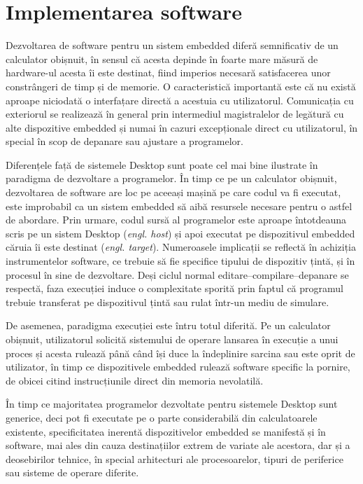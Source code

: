 \chapter{Implementarea software}

Dezvoltarea de software pentru un sistem embedded diferă semnificativ de un calculator obișnuit, în sensul că acesta depinde în foarte mare măsură de hardware-ul acesta îi este destinat, fiind imperios necesară satisfacerea unor constrângeri de timp și de memorie. O caracteristică importantă este că nu există aproape niciodată o interfațare directă a acestuia cu utilizatorul. Comunicația cu exteriorul se realizează în general prin intermediul magistralelor de legătură cu alte dispozitive embedded și numai în cazuri excepționale direct cu utilizatorul, în special în scop de depanare sau ajustare a programelor.

Diferențele față de sistemele Desktop sunt poate cel mai bine ilustrate în paradigma de dezvoltare a programelor. În timp ce pe un calculator obișnuit, dezvoltarea de software are loc pe aceeași mașină pe care codul va fi executat, este improbabil ca un sistem embedded să aibă resursele necesare pentru o astfel de abordare. Prin urmare, codul sursă al programelor este aproape întotdeauna scris pe un sistem Desktop (\textit{engl. host}) și apoi executat pe dispozitivul embedded căruia îi este destinat (\textit{engl. target}). Numeroasele implicații se reflectă în achiziția instrumentelor software, ce trebuie să fie specifice tipului de dispozitiv țintă, și în procesul în sine de dezvoltare. Deși ciclul normal editare--compilare--depanare se respectă, faza execuției induce o complexitate sporită prin faptul că programul trebuie transferat pe dispozitivul țintă sau rulat într-un mediu de simulare. \cite{walls}

De asemenea, paradigma execuției este întru totul diferită. Pe un calculator obișnuit, utilizatorul solicită sistemului de operare lansarea în execuție a unui proces și acesta rulează până când își duce la îndeplinire sarcina sau este oprit de utilizator, în timp ce dispozitivele embedded rulează software specific la pornire, de obicei citind instrucțiunile direct din memoria nevolatilă. \cite{walls}

În timp ce majoritatea programelor dezvoltate pentru sistemele Desktop sunt generice, deci pot fi executate pe o parte considerabilă din calculatoarele existente, specificitatea inerentă dispozitivelor embedded se manifestă și în software, mai ales din cauza destinațiilor extrem de variate ale acestora, dar și a deosebirilor tehnice, în special arhitecturi ale procesoarelor, tipuri de periferice sau sisteme de operare diferite.


